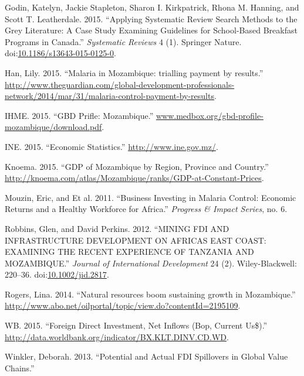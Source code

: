 \documentclass[]{elsarticle} %
\begin{document}
\hypertarget{ref-Godin2015}{}
Godin, Katelyn, Jackie Stapleton, Sharon I. Kirkpatrick, Rhona M.
Hanning, and Scott T. Leatherdale. 2015. ``Applying Systematic Review
Search Methods to the Grey Literature: A Case Study Examining Guidelines
for School-Based Breakfast Programs in Canada.'' \emph{Systematic
Reviews} 4 (1). Springer Nature.
doi:\href{https://doi.org/10.1186/s13643-015-0125-0}{10.1186/s13643-015-0125-0}.

\hypertarget{ref-Han}{}
Han, Lily. 2015. ``Malaria in Mozambique: trialling payment by
results.''
\url{http://www.theguardian.com/global-development-professionals-network/2014/mar/31/malaria-control-payment-by-results}.

\hypertarget{ref-ihme}{}
IHME. 2015. ``GBD Prifle: Mozambique.''
\url{www.medbox.org/gbd-profile-mozambique/download.pdf}.

\hypertarget{ref-estatistica}{}
INE. 2015. ``Economic Statistics.'' \url{http://www.ine.gov.mz/}.

\hypertarget{ref-knoema}{}
Knoema. 2015. ``GDP of Mozambique by Region, Province and Country.''
\url{http://knoema.com/atlas/Mozambique/ranks/GDP-at-Constant-Prices}.

\hypertarget{ref-Mouzin2011}{}
Mouzin, Eric, and Et al. 2011. ``Business Investing in Malaria Control:
Economic Returns and a Healthy Workforce for Africa.'' \emph{Progress \&
Impact Series}, no. 6.

\hypertarget{ref-Robbins2012}{}
Robbins, Glen, and David Perkins. 2012. ``MINING FDI AND INFRASTRUCTURE
DEVELOPMENT ON AFRICAS EAST COAST: EXAMINING THE RECENT EXPERIENCE OF
TANZANIA AND MOZAMBIQUE.'' \emph{Journal of International Development}
24 (2). Wiley-Blackwell: 220--36.
doi:\href{https://doi.org/10.1002/jid.2817}{10.1002/jid.2817}.

\hypertarget{ref-Rogers}{}
Rogers, Lina. 2014. ``Natural resources boom sustaining growth in
Mozambique.''
\url{http://www.abo.net/oilportal/topic/view.do?contentId=2195109}.

\hypertarget{ref-wbdata}{}
WB. 2015. ``Foreign Direct Investment, Net Inflows (Bop, Current
Us\$).'' \url{http://data.worldbank.org/indicator/BX.KLT.DINV.CD.WD}.

\hypertarget{ref-Winkler}{}
Winkler, Deborah. 2013. ``Potential and Actual FDI Spillovers in Global
Value Chains.''
\end{document}
